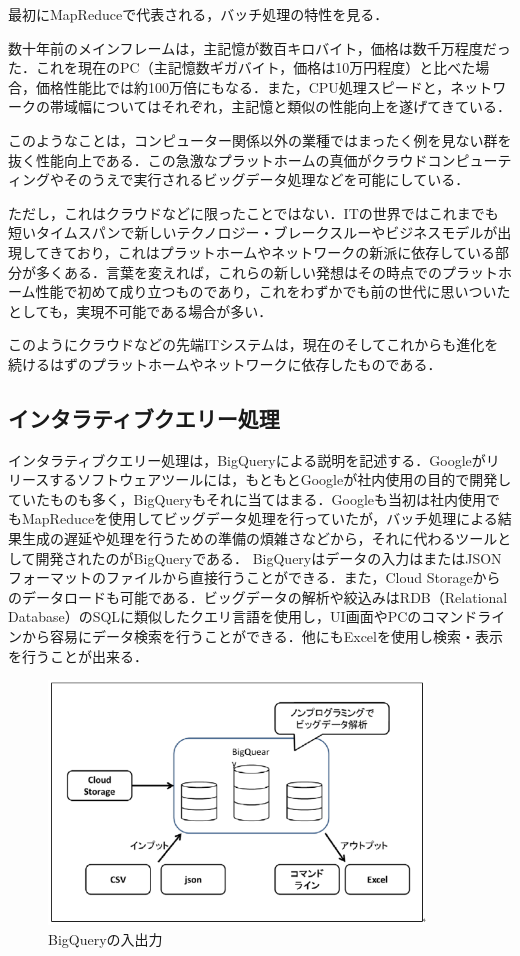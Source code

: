 最初にMapReduceで代表される，バッチ処理の特性を見る．

数十年前のメインフレームは，主記憶が数百キロバイト，価格は数千万程度だった．これを現在のPC（主記憶数ギガバイト，価格は10万円程度）と比べた場合，価格性能比では約100万倍にもなる．また，CPU処理スピードと，ネットワークの帯域幅についてはそれぞれ，主記憶と類似の性能向上を遂げてきている．

このようなことは，コンピューター関係以外の業種ではまったく例を見ない群を抜く性能向上である．この急激なプラットホームの真価がクラウドコンピューティングやそのうえで実行されるビッグデータ処理などを可能にしている．\cite{bigquerystart}

ただし，これはクラウドなどに限ったことではない．ITの世界ではこれまでも短いタイムスパンで新しいテクノロジー・ブレークスルーやビジネスモデルが出現してきており，これはプラットホームやネットワークの新派に依存している部分が多くある．言葉を変えれば，これらの新しい発想はその時点でのプラットホーム性能で初めて成り立つものであり，これをわずかでも前の世代に思いついたとしても，実現不可能である場合が多い．

このようにクラウドなどの先端ITシステムは，現在のそしてこれからも進化を続けるはずのプラットホームやネットワークに依存したものである．\cite{bigquerystart}

\subsection{インタラティブクエリー処理}

インタラティブクエリー処理は，BigQueryによる説明を記述する．Googleがリリースするソフトウェアツールには，もともとGoogleが社内使用の目的で開発していたものも多く，BigQueryもそれに当てはまる．Googleも当初は社内使用でもMapReduceを使用してビッグデータ処理を行っていたが，バッチ処理による結果生成の遅延や処理を行うための準備の煩雑さなどから，それに代わるツールとして開発されたのがBigQueryである．
BigQueryはデータの入力はまたはJSONフォーマットのファイルから直接行うことができる．また，Cloud Storageからのデータロードも可能である．ビッグデータの解析や絞込みはRDB（Relational Database）のSQLに類似したクエリ言語を使用し，UI画面やPCのコマンドラインから容易にデータ検索を行うことができる．他にもExcelを使用し検索・表示を行うことが出来る．\cite{bigquerystart}


\begin{figure}[H]
\centering
\includegraphics[width=10cm]{bigqueryinout.png}
\caption{BigQueryの入出力}\label{サンプル図}
\end{figure}


